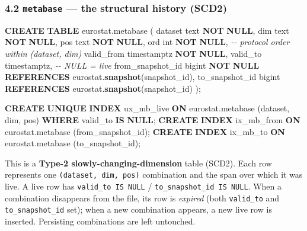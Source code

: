 \documentclass[
]{article}
\newenvironment{Shaded}{\begin{snugshade}}{\end{snugshade}}
\newcommand{\CommentTok}[1]{\textcolor[rgb]{0.56,0.35,0.01}{\textit{#1}}}
\newcommand{\DataTypeTok}[1]{\textcolor[rgb]{0.13,0.29,0.53}{#1}}
\newcommand{\KeywordTok}[1]{\textcolor[rgb]{0.13,0.29,0.53}{\textbf{#1}}}
\newcommand{\NormalTok}[1]{#1}
\begin{document}
\subsubsection{\texorpdfstring{4.2 \texttt{metabase} --- the structural
history
(SCD2)}{4.2 metabase --- the structural history (SCD2)}}\label{metabase-the-structural-history-scd2}

\begin{Shaded}
\begin{Highlighting}[]
\KeywordTok{CREATE} \KeywordTok{TABLE}\NormalTok{ eurostat.metabase (}
\NormalTok{  dataset text }\KeywordTok{NOT} \KeywordTok{NULL}\NormalTok{,}
\NormalTok{  dim     text }\KeywordTok{NOT} \KeywordTok{NULL}\NormalTok{,}
\NormalTok{  pos     text }\KeywordTok{NOT} \KeywordTok{NULL}\NormalTok{,}
\NormalTok{  ord     }\DataTypeTok{int}  \KeywordTok{NOT} \KeywordTok{NULL}\NormalTok{,              }\CommentTok{{-}{-} protocol order within (dataset, dim)}
\NormalTok{  valid\_from timestamptz }\KeywordTok{NOT} \KeywordTok{NULL}\NormalTok{,}
\NormalTok{  valid\_to   timestamptz,             }\CommentTok{{-}{-} NULL = live}
\NormalTok{  from\_snapshot\_id bigint }\KeywordTok{NOT} \KeywordTok{NULL} \KeywordTok{REFERENCES}\NormalTok{ eurostat.}\KeywordTok{snapshot}\NormalTok{(snapshot\_id),}
\NormalTok{  to\_snapshot\_id   bigint          }\KeywordTok{REFERENCES}\NormalTok{ eurostat.}\KeywordTok{snapshot}\NormalTok{(snapshot\_id)}
\NormalTok{);}

\KeywordTok{CREATE} \KeywordTok{UNIQUE} \KeywordTok{INDEX}\NormalTok{ ux\_mb\_live }\KeywordTok{ON}\NormalTok{ eurostat.metabase (dataset, dim, pos)}
  \KeywordTok{WHERE}\NormalTok{ valid\_to }\KeywordTok{IS} \KeywordTok{NULL}\NormalTok{;}
\KeywordTok{CREATE} \KeywordTok{INDEX}\NormalTok{ ix\_mb\_from }\KeywordTok{ON}\NormalTok{ eurostat.metabase (from\_snapshot\_id);}
\KeywordTok{CREATE} \KeywordTok{INDEX}\NormalTok{ ix\_mb\_to   }\KeywordTok{ON}\NormalTok{ eurostat.metabase (to\_snapshot\_id);}
\end{Highlighting}
\end{Shaded}

This is a \textbf{Type-2 slowly-changing-dimension} table (SCD2). Each
row represents one \texttt{(dataset,\ dim,\ pos)} combination and the
span over which it was live. A live row has \texttt{valid\_to\ IS\ NULL}
/ \texttt{to\_snapshot\_id\ IS\ NULL}. When a combination disappears
from the file, its row is \emph{expired} (both \texttt{valid\_to} and
\texttt{to\_snapshot\_id} set); when a new combination appears, a new
live row is inserted. Persisting combinations are left untouched.
\end{document}
